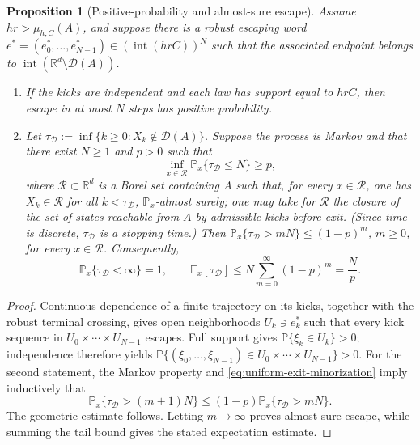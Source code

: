 \documentclass[pdflatex,sn-mathphys-num]{sn-jnl}
\numberwithin{equation}{section}
\theoremstyle{thmstyleone}%
\newtheorem{proposition}[theorem]{Proposition}
\theoremstyle{definition}
\theoremstyle{remark}
\begin{document}
\begin{proposition}[Positive-probability and almost-sure escape]
\label{prop:probabilistic-escape}
Assume $hr>\mu_{h,C}(A)$, and suppose there is a robust escaping word
    $e^\ast=(e_0^\ast,\ldots,e_{N-1}^\ast)
    \in(\operatorname{int}(hrC))^N$
such that the associated endpoint belongs to
$\operatorname{int}(\mathbb R^d\setminus\mathcal D(A))$.
\begin{enumerate}
    \item If the kicks are independent and each law has support equal to $hrC$, then escape in at most $N$ steps has positive probability.
    \item Let $\tau_{\mathcal D} := \inf\{k\geq0:X_k\notin\mathcal D(A)\}$. Suppose the process is Markov and that there exist $N\geq1$ and $p>0$ such that
    \begin{equation}
        \inf_{x\in\mathcal R}
        \mathbb P_x\{\tau_{\mathcal D}\leq N\}
        \geq p,
        \label{eq:uniform-exit-minorization}
    \end{equation}
    where $\mathcal R\subset\mathbb R^d$ is a Borel set containing $A$ such that, for every $x\in\mathcal R$, one has $X_k\in\mathcal R$ for all $k<\tau_{\mathcal D}$, $\mathbb P_x$-almost surely; one may take for $\mathcal R$ the closure of the set of states reachable from $A$ by admissible kicks before exit. (Since time is discrete,
    $\tau_{\mathcal D}$ is a stopping time.) Then
        $\mathbb P_x\{\tau_{\mathcal D}>mN\}
        \leq(1-p)^m$,
         $m\geq0$,
    for every $x\in\mathcal R$. Consequently,
\[
\mathbb P_x\{\tau_{\mathcal D}<\infty\}=1,
\qquad
\mathbb E_x[\tau_{\mathcal D}]
\leq
N\sum_{m=0}^{\infty}(1-p)^m
=
\frac{N}{p}.
\]
\end{enumerate}
\end{proposition}

\begin{proof}
Continuous dependence of a finite trajectory on its kicks, together with
the robust terminal crossing, gives open neighborhoods
$U_k\ni e_k^\ast$ such that every kick sequence in
$U_0\times\cdots\times U_{N-1}$ escapes. Full support gives
$\mathbb P\{\xi_k\in U_k\}>0$; independence therefore yields
    $\mathbb P\{(\xi_0,\ldots,\xi_{N-1})
    \in U_0\times\cdots\times U_{N-1}\}>0$.
For the second statement, the Markov property and
\eqref{eq:uniform-exit-minorization} imply inductively that
$$
    \mathbb P_x\{\tau_{\mathcal D}>(m+1)N\}
    \leq
    (1-p)\mathbb P_x\{\tau_{\mathcal D}>mN\}.
$$
The geometric estimate follows. Letting $m\to\infty$ proves almost-sure
escape, while summing the tail bound gives the stated expectation estimate.
\end{proof}
\end{document}
